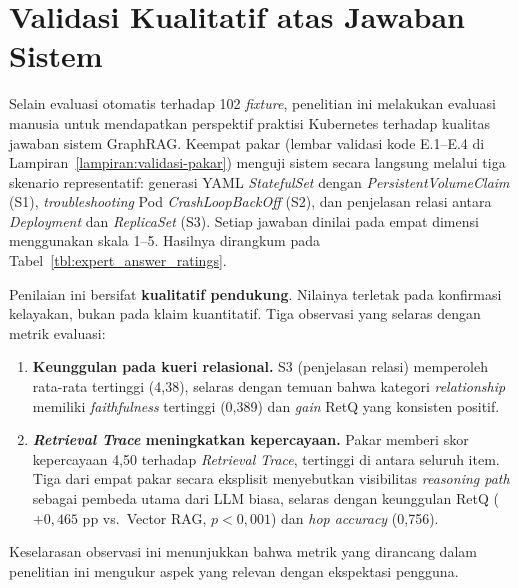 \section{Validasi Kualitatif atas Jawaban Sistem}
\label{sec:validasi-pakar-jawaban}

Selain evaluasi otomatis terhadap 102 \textit{fixture}, penelitian ini melakukan evaluasi manusia untuk mendapatkan perspektif praktisi Kubernetes terhadap kualitas jawaban sistem GraphRAG. Keempat pakar (lembar validasi kode E.1--E.4 di Lampiran~\ref{lampiran:validasi-pakar}) menguji sistem secara langsung melalui tiga skenario representatif: generasi YAML \textit{StatefulSet} dengan \textit{PersistentVolumeClaim} (S1), \textit{troubleshooting} Pod \textit{CrashLoopBackOff} (S2), dan penjelasan relasi antara \textit{Deployment} dan \textit{ReplicaSet} (S3). Setiap jawaban dinilai pada empat dimensi menggunakan skala 1--5. Hasilnya dirangkum pada Tabel~\ref{tbl:expert_answer_ratings}.



Penilaian ini bersifat \textbf{kualitatif pendukung}. Nilainya terletak pada konfirmasi kelayakan, bukan pada klaim kuantitatif. Tiga observasi yang selaras dengan metrik evaluasi:

\begin{enumerate}
    \item \textbf{Keunggulan pada kueri relasional.} S3 (penjelasan relasi) memperoleh rata-rata tertinggi (4,38), selaras dengan temuan bahwa kategori \textit{relationship} memiliki \textit{faithfulness} tertinggi (0,389) dan \textit{gain} RetQ yang konsisten positif.

    \item \textbf{\textit{Retrieval Trace} meningkatkan kepercayaan.} Pakar memberi skor kepercayaan 4,50 terhadap \textit{Retrieval Trace}, tertinggi di antara seluruh item. Tiga dari empat pakar secara eksplisit menyebutkan visibilitas \textit{reasoning path} sebagai pembeda utama dari LLM biasa, selaras dengan keunggulan RetQ ($+0{,}465$ pp vs.\ Vector RAG, $p{<}0{,}001$) dan \textit{hop accuracy} (0,756).
\end{enumerate}

Keselarasan observasi ini menunjukkan bahwa metrik yang dirancang dalam penelitian ini mengukur aspek yang relevan dengan ekspektasi pengguna.
